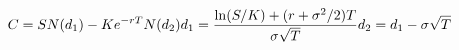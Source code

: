 \documentclass[preview]{standalone}
\begin{document}
\begin{align*}
\special{dvisvgm:raw <g id='unique000'>}C = S N(d_1) - Ke^{-rT}N(d_2) \special{dvisvgm:raw </g>}\special{dvisvgm:raw <g id='unique001'>}d_1 = \frac{\ln(S/K)+(r+\sigma^2/2)T}{\sigma\sqrt{T}} \special{dvisvgm:raw </g>}\special{dvisvgm:raw <g id='unique002'>}d_2 = d_1 - \sigma\sqrt{T}\special{dvisvgm:raw </g>}
\end{align*}
\end{document}

